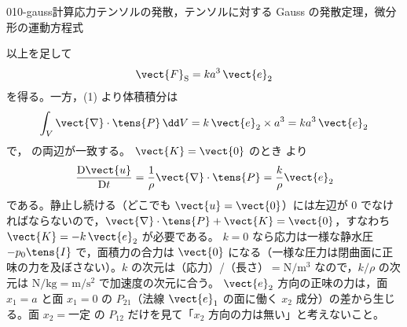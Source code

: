 \documentclass[uplatex,dvipdfmx,a4paper,11pt]{jsarticle}
\begin{document}
\begin{mondai}{010-gauss}{計算}{応力テンソルの発散，テンソルに対する Gauss の発散定理，微分形の運動方程式}
\begin{tadashii}
以上を足して
\[ \vect{F}_{\mathrm{S}}=ka^{3}\,\vect{e}_2 \]
を得る。一方，(1) より体積積分は
\[ \int_V\vect{\nabla}\cdot\tens{P}\,\dd V=k\,\vect{e}_2\times a^{3}=ka^{3}\,\vect{e}_2 \]
で， の両辺が一致する。
 $\vect{K}=\vect{0}$ のとき  より
\[ \frac{\mathrm{D}\vect{u}}{\mathrm{D}t}=\frac{1}{\rho}\vect{\nabla}\cdot\tens{P}=\frac{k}{\rho}\vect{e}_2 \]
である。静止し続ける（どこでも $\vect{u}=\vect{0}$）には左辺が $0$ でなければならないので，$\vect{\nabla}\cdot\tens{P}+\vect{K}=\vect{0}$，すなわち $\vect{K}=-k\,\vect{e}_2$ が必要である。
\kenzan $k=0$ なら応力は一様な静水圧 $-p_0\tens{I}$ で，面積力の合力は $\vect{0}$ になる（一様な圧力は閉曲面に正味の力を及ぼさない）。$k$ の次元は（応力）/（長さ）$=\unit{\newton\per\metre\cubed}$ なので，$k/\rho$ の次元は $\unit{\newton\per\kilogram}=\unit{\metre\per\second\squared}$ で加速度の次元に合う。
\tsumazuki $\vect{e}_2$ 方向の正味の力は，面 $x_1=a$ と面 $x_1=0$ の $P_{21}$（法線 $\vect{e}_1$ の面に働く $x_2$ 成分）の差から生じる。面 $x_2=\text{一定}$ の $P_{12}$ だけを見て「$x_2$ 方向の力は無い」と考えないこと。
\end{tadashii}
\end{mondai}
\end{document}
